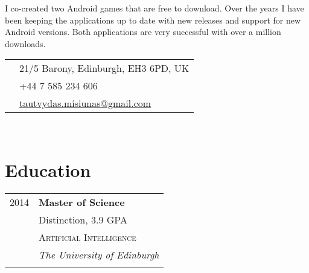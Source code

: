 \documentclass[10pt]{article} %
\begin{document}
{\begin{minipage}[t]{0.5\textwidth}
\normalsize{I co-created two Android games that are free to download. 
Over the years I have been keeping the applications up to date with 
new releases and support for new Android versions. 
Both applications are very successful with over a million downloads.}\\


\end{minipage} %
\hfill
\begin{minipage}[t]{0.44\textwidth} %
\vspace{0pt} %


\colorbox{shade}{\textcolor{text1}{
\begin{tabular}{c|p{7cm}}
\raisebox{-4pt}{\textifsymbol{18}} & 21/5 Barony, Edinburgh, EH3 6PD, UK \\ %
\raisebox{-3pt}{\Mobilefone} & +44 7 585 234 606 \\ %
\raisebox{-1pt}{\Letter} & \href{mailto:tautvydas.misiunas@gmail.com}{tautvydas.misiunas@gmail.com} \\ %
\end{tabular}
}
}\\[10pt]


\section{Education} 

\begin{tabular}{rl} %

2014 & \textbf{Master of Science} \\ 
& \small Distinction, 3.9 GPA \\
& \textsc{Artificial Intelligence} \\ 
& \textit{The University of Edinburgh}\\
&\\


\end{tabular}
\end{minipage}}
\end{document}

